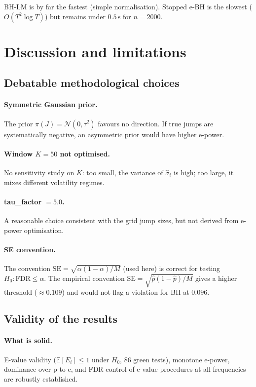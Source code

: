 \documentclass[11pt,a4paper,twocolumn]{article}
\theoremstyle{plain}
\theoremstyle{definition}
\theoremstyle{remark}
\newcommand{\E}{\mathbb{E}}
\newcommand{\FDR}{\mathrm{FDR}}
\begin{document}
BH-LM is by far the fastest (simple normalisation). Stopped e-BH is the
slowest ($O(T^2 \log T)$) but remains under $0.5\,\mathrm{s}$ for $n = 2000$.


\section{Discussion and limitations}
\label{sec:discussion}


\subsection{Debatable methodological choices}

\paragraph{Symmetric Gaussian prior.}
The prior $\pi(J) = \mathcal{N}(0, \tau^2)$ favours no direction. If true
jumps are systematically negative, an asymmetric prior would have higher
e-power.

\paragraph{Window $K = 50$ not optimised.}
No sensitivity study on $K$: too small, the variance of $\hat{\sigma}_i$ is
high; too large, it mixes different volatility regimes.

\paragraph{tau\_factor $= 5.0$.}
A reasonable choice consistent with the grid jump sizes, but not derived
from e-power optimisation.

 \paragraph{SE convention.}
    The convention $\mathrm{SE} = \sqrt{\alpha(1-\alpha)/M}$ (used here) is
    correct for testing $H_0 : \FDR \le \alpha$. The empirical convention
    $\mathrm{SE} = \sqrt{\hat{p}(1-\hat{p})/M}$ gives a higher threshold
    ($\approx 0.109$) and would not flag a violation for BH at $0.096$.

\subsection{Validity of the results}

\paragraph{What is solid.}
E-value validity ($\E[E_i] \le 1$ under $H_0$, 86 green tests), monotone
e-power, dominance over p-to-e, and FDR control of e-value procedures at
all frequencies are robustly established.
\end{document}
